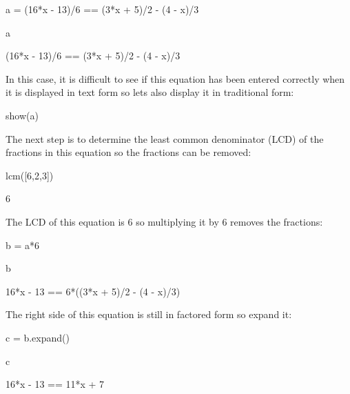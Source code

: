 \documentclass[12pt,twoside]{book}
\begin{document}
{\textquotedbl}{\textquotedbl}{\textquotedbl}

a = (16*x {}- 13)/6 == (3*x + 5)/2 {}- (4 {}- x)/3

a

{\textbar}

(16*x {}- 13)/6 == (3*x + 5)/2 {}- (4 {}- x)/3


\bigskip

{\textquotedbl}{\textquotedbl}{\textquotedbl}

In this case, it is difficult to see if this equation has been entered
correctly when it is displayed in text form so lets also display it in
traditional form:

{\textquotedbl}{\textquotedbl}{\textquotedbl}

show(a)

{\textbar}


\bigskip



{\textquotedbl}{\textquotedbl}{\textquotedbl}

The next step is to determine the least common denominator (LCD) of the
fractions in this equation so the fractions can be removed:

{\textquotedbl}{\textquotedbl}{\textquotedbl}

lcm([6,2,3])

{\textbar}

6


\bigskip

{\textquotedbl}{\textquotedbl}{\textquotedbl}

The LCD of this equation is 6 so multiplying it by 6 removes the
fractions:

{\textquotedbl}{\textquotedbl}{\textquotedbl}

b = a*6

b

{\textbar}

16*x {}- 13 == 6*((3*x + 5)/2 {}- (4 {}- x)/3)


\bigskip

{\textquotedbl}{\textquotedbl}{\textquotedbl}

The right side of this equation is still in factored form so expand it:

{\textquotedbl}{\textquotedbl}{\textquotedbl}

c = b.expand()

c

{\textbar}

16*x {}- 13 == 11*x + 7
\end{document}
